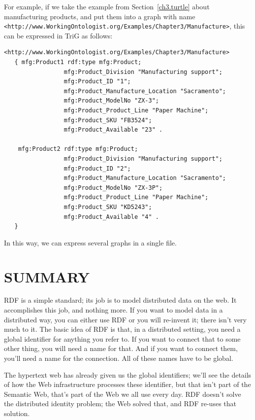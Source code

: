 For example, if we take the 
example from Section~\ref{ch3.turtle} about manufacturing products, and put them into a graph with name \texttt{<http://www.WorkingOntologist.org/Examples/Chapter3/Manufacture>}, this can be expressed in TriG as follows: 


\begin{lstlisting}
<http://www.WorkingOntologist.org/Examples/Chapter3/Manufacture> 
   { mfg:Product1 rdf:type mfg:Product;
                 mfg:Product_Division "Manufacturing support"; 
                 mfg:Product_ID "1";
                 mfg:Product_Manufacture_Location "Sacramento";
                 mfg:Product_ModelNo "ZX-3"; 
                 mfg:Product_Product_Line "Paper Machine"; 
                 mfg:Product_SKU "FB3524";
                 mfg:Product_Available "23" .
    
    mfg:Product2 rdf:type mfg:Product; 
                 mfg:Product_Division "Manufacturing support"; 
                 mfg:Product_ID "2"; 
                 mfg:Product_Manufacture_Location "Sacramento"; 
                 mfg:Product_ModelNo "ZX-3P"; 
                 mfg:Product_Product_Line "Paper Machine"; 
                 mfg:Product_SKU "KD5243";
                 mfg:Product_Available "4" .
   }
\end{lstlisting}

In this way, we can express several graphs in a single file. 




\section{SUMMARY}


RDF is a simple standard; its job is to model distributed data on the web.
It accomplishes this job, and nothing more.  If you want to model data in a
distributed way,  you can either use RDF or you will re-invent it; there isn't very
much to it.  The basic idea of RDF is that, in a distributed setting, you need a global 
identifier for anything you refer to.  If you want to connect that to some other 
thing, you will need a name for that.  And if you want to connect them, you'll need a
name for the connection.  All of these names have to be global. 

The hypertext web has already given us the global identifiers; we'll see the details of how
the Web infrastructure processes these identifier, but that isn't part of the Semantic Web, that's
part of the Web we all use every day.  RDF doesn't solve the distributed identity problem; the Web solved that,
and RDF re-uses that solution. 

